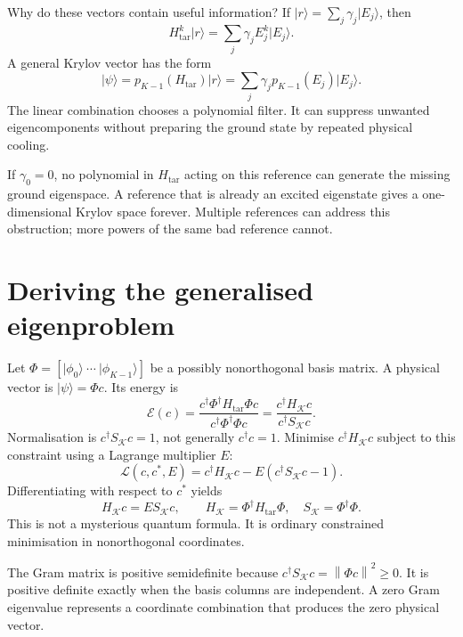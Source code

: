 \documentclass[11pt,a4paper,oneside]{report}
\newcommand{\ket}[1]{\lvert #1\rangle}
\newcommand{\norm}[1]{\left\lVert #1\right\rVert}
\newcommand{\Ht}{H_{\mathrm{tar}}}
\newcommand{\HK}{H_{\mathcal K}}
\newcommand{\SK}{S_{\mathcal K}}
\begin{document}
Why do these vectors contain useful information? If $\ket r=\sum_j\gamma_j\ket{E_j}$, then
\begin{equation}
\Ht^k\ket r=\sum_j\gamma_jE_j^k\ket{E_j}.
\end{equation}
A general Krylov vector has the form
\begin{equation}
\ket\psi=p_{K-1}(\Ht)\ket r
=\sum_j\gamma_jp_{K-1}(E_j)\ket{E_j}.
\end{equation}
The linear combination chooses a polynomial filter. It can suppress unwanted eigencomponents without preparing the ground state by repeated physical cooling.

\begin{caution}
If $\gamma_0=0$, no polynomial in $\Ht$ acting on this reference can generate the missing ground eigenspace. A reference that is already an excited eigenstate gives a one-dimensional Krylov space forever. Multiple references can address this obstruction; more powers of the same bad reference cannot.
\end{caution}

\section{Deriving the generalised eigenproblem}
Let $\Phi=[\ket{\phi_0}\ \cdots\ \ket{\phi_{K-1}}]$ be a possibly nonorthogonal basis matrix. A physical vector is $\ket\psi=\Phi c$. Its energy is
\begin{equation}\label{eq:projectedRayleigh}
\mathcal E(c)=\frac{c^\dagger\Phi^\dagger\Ht\Phi c}{c^\dagger\Phi^\dagger\Phi c}
=\frac{c^\dagger\HK c}{c^\dagger\SK c}.
\end{equation}
Normalisation is $c^\dagger\SK c=1$, not generally $c^\dagger c=1$. Minimise $c^\dagger\HK c$ subject to this constraint using a Lagrange multiplier $E$:
\begin{equation}
\mathcal L(c,c^*,E)=c^\dagger\HK c-E(c^\dagger\SK c-1).
\end{equation}
Differentiating with respect to $c^*$ yields
\begin{equation}\label{eq:gep}
\boxed{\HK c=E\SK c},\qquad
\HK=\Phi^\dagger\Ht\Phi,\quad\SK=\Phi^\dagger\Phi.
\end{equation}
This is not a mysterious quantum formula. It is ordinary constrained minimisation in nonorthogonal coordinates.

The Gram matrix is positive semidefinite because $c^\dagger\SK c=\norm{\Phi c}^2\ge0$. It is positive definite exactly when the basis columns are independent. A zero Gram eigenvalue represents a coordinate combination that produces the zero physical vector.
\end{document}
